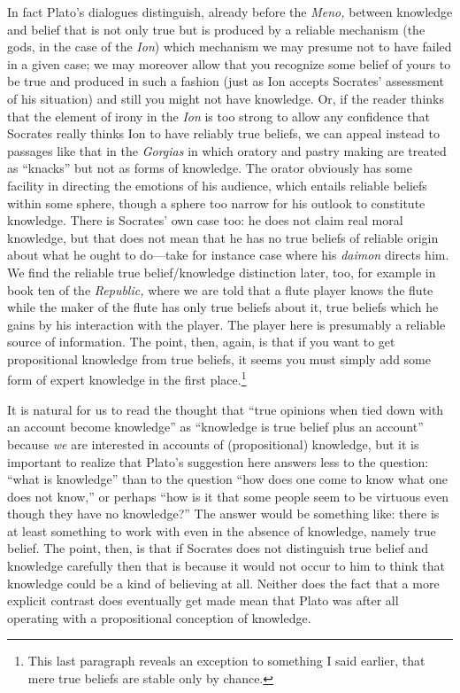 \documentclass[11pt]{amsart}
\begin{document}
In fact Plato's dialogues distinguish, already before the \emph{Meno,} between knowledge and belief that is not only true but is produced by a reliable mechanism (the gods, in the case of the \emph{Ion}) which mechanism we may presume not to have failed in a given case; we may moreover allow that you recognize some belief of yours to be true and produced in such a fashion (just as Ion accepts Socrates' assessment of his situation) and still you might not have knowledge. Or, if the reader thinks that the element of irony in the \emph{Ion} is too strong to allow any confidence that Socrates really thinks Ion to have reliably true beliefs, we can appeal instead to passages like that in the \emph{Gorgias} in which oratory and pastry making are treated as ``knacks'' but not as forms of knowledge. The orator obviously has some facility in directing the emotions of his audience, which entails reliable beliefs within some sphere, though a sphere too narrow for his outlook to constitute knowledge. There is Socrates' own case too: he does not claim real moral knowledge, but that does not mean that he has no true beliefs of reliable origin about what he ought to do---take for instance case where his \emph{daimon} directs him. We find the reliable true belief/knowledge distinction later, too, for example in book ten of the \emph{Republic,} where we are told that a flute player knows the flute while the maker of the flute has only true beliefs about it, true beliefs which he gains by his interaction with the player. The player here is presumably a reliable source of information. The point, then, again, is that if you want to get propositional knowledge from true beliefs, it seems you must simply add some form of expert knowledge in the first place.\footnote{This last paragraph reveals an exception to something I said earlier, that mere true beliefs are stable only by chance.}



It is natural for us to read the thought that ``true opinions when tied down with an account become knowledge'' as ``knowledge is true belief plus an account'' because \emph{we} are interested in accounts of (propositional) knowledge, but it is important to realize that Plato's suggestion here answers less to the question: ``what is knowledge'' than to the question ``how does one come to know what one does not know,'' or perhaps ``how is it that some people seem to be virtuous even though they have no knowledge?'' The answer would be something like: there is at least something to work with even in the absence of knowledge, namely true belief. The point, then, is that if Socrates does not distinguish true belief and knowledge carefully then that is because it would not occur to him to think that knowledge could be a kind of believing at all. Neither does the fact that a more explicit contrast does eventually get made mean that Plato was after all operating with a propositional conception of knowledge.
\end{document}
